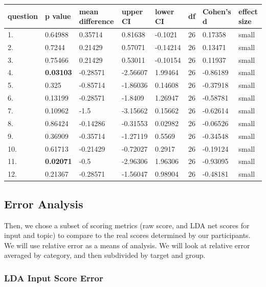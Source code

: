 \documentclass[11pt, twoside, reqno]{book}
\begin{document}
\begin{tabular}{|l|l|l|l|l|l|l|l|}
\hline
    question & p value & mean difference & upper CI & lower CI & df & Cohen's d & effect size  \\ \hline
    1. & 0.64988 & 0.35714 & 0.81638 & -0.1021 & 26 & 0.17358 & small \\ \hline
    2. & 0.7244 & 0.21429 & 0.57071 & -0.14214 & 26 & 0.13471 & small  \\ \hline
    3. & 0.75466 & 0.21429 & 0.53011 & -0.10154 & 26 & 0.11937 & small  \\ \hline
    4. & \textbf{0.03103} & -0.28571 & -2.56607 & 1.99464 & 26 & -0.86189 & small \\ \hline
    5. & 0.325 & -0.85714 & -1.86036 & 0.14608 & 26 & -0.37918 & small  \\ \hline
    6. & 0.13199 & -0.28571 & -1.8409 & 1.26947 & 26 & -0.58781 & small \\ \hline
    7. & 0.10962 & -1.5 & -3.15662 & 0.15662 & 26 & -0.62614 & small \\ \hline
    8. & 0.86424 & -0.14286 & -0.31553 & 0.02982 & 26 & -0.06526 & small \\ \hline
    9. & 0.36909 & -0.35714 & -1.27119 & 0.5569 & 26 & -0.34548 & small \\ \hline
    10. & 0.61713 & -0.21429 & -0.72027 & 0.2917 & 26 & -0.19124 & small  \\ \hline
    11. & \textbf{0.02071} & -0.5 & -2.96306 & 1.96306 & 26 & -0.93095 & small \\ \hline
    12. & 0.21367 & -0.28571 & -1.56047 & 0.98904 & 26 & -0.48181 & small \\ \hline
\end{tabular}
\vspace{16pt}

\subsection{Error Analysis}

Then, we chose a subset of scoring metrics (raw score, and LDA net scores for input and topic) to compare to the real scores determined by our participants. We will use relative error as a means of analysis. We will look at relative error averaged by category, and then subdivided by target and group.

\subsubsection{\textbf{LDA Input Score Error}}
\end{document}
